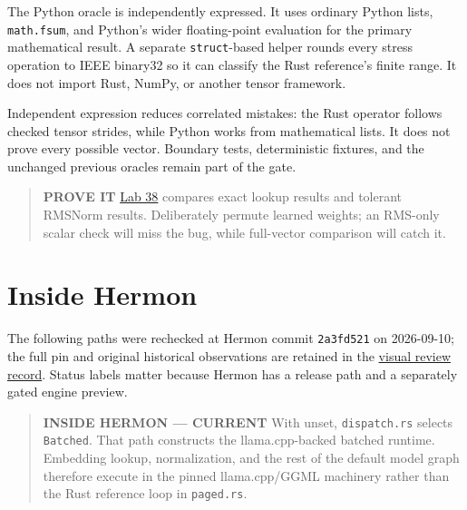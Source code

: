 The Python oracle is independently expressed. It uses ordinary Python
lists, \texttt{math.fsum}, and Python's wider floating-point evaluation
for the primary mathematical result. A separate \texttt{struct}-based
helper rounds every stress operation to IEEE binary32 so it can classify
the Rust reference's finite range. It does not import Rust, NumPy, or
another tensor framework.

Independent expression reduces correlated mistakes: the Rust operator
follows checked tensor strides, while Python works from mathematical
lists. It does not prove every possible vector. Boundary tests,
deterministic fixtures, and the unchanged previous oracles remain part
of the gate.

\begin{quote}
\textbf{PROVE IT}
\href{https://github.com/hermonai/inside-the-llm-engine/blob/astra-visual-rewrite/labs/lab-38-rust-python-rmsnorm.md}{Lab
38} compares exact lookup results and tolerant RMSNorm results.
Deliberately permute learned weights; an RMS-only scalar check will miss
the bug, while full-vector comparison will catch it.
\end{quote}

\section{Inside Hermon}\label{inside-hermon-3}


The following paths were rechecked at Hermon commit \texttt{2a3fd521} on
2026-09-10; the full pin and original historical observations are
retained in the
\href{https://github.com/hermonai/inside-the-llm-engine/blob/astra-visual-rewrite/research/astra/chapter07-regeneration.md}{visual
review record}. Status labels matter because Hermon has a release path
and a separately gated engine preview.

\begin{quote}
\textbf{INSIDE HERMON --- CURRENT} With
\texttt{} unset, \texttt{dispatch.rs}
selects \texttt{Batched}. That path constructs the llama.cpp-backed
batched runtime. Embedding lookup, normalization, and the rest of the
default model graph therefore execute in the pinned llama.cpp/GGML
machinery rather than the Rust reference loop in \texttt{paged.rs}.
\end{quote}

